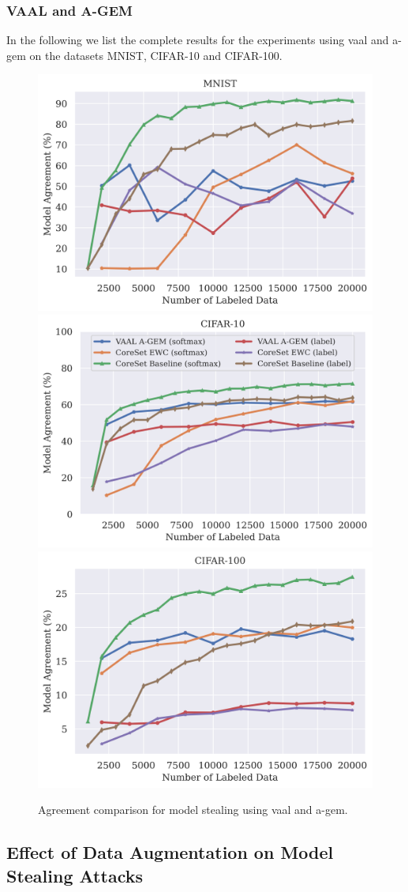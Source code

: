 \subsubsection{VAAL and A-GEM}
\label{sec:Appendix:CALMS:VAALAGEM}
In the following we list the complete results for the experiments using \gls{vaal} and \gls{a-gem} on the datasets MNIST, CIFAR-10 and CIFAR-100.
\begin{figure}[!htb]
    \centering
    \includegraphics[width=0.316\linewidth]{images/results_CALMS/mnist_vaal_agem.png} 
    \includegraphics[width=0.32\linewidth]{images/results_CALMS/cifar_vaal_agem.png}
    \includegraphics[width=0.316\linewidth]{images/results_CALMS/cifar100_vaal_agem.png}
    \caption{Agreement comparison for model stealing using \gls{vaal} and \gls{a-gem}.}
    \label{fig:CALMS_VAAL_AGEM}
\end{figure}

\subsection{Effect of Data Augmentation on Model Stealing Attacks}
\label{sec:Appendix:EffectDataAugmentation}

